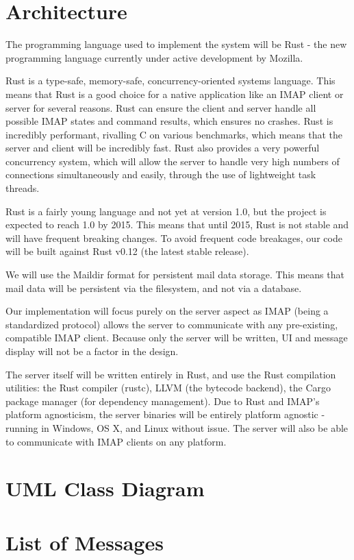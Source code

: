 \documentclass[a4paper,12pt]{article}
\begin{document}
\section*{Architecture}

The programming language used to implement the system will be Rust - the new programming language currently under active development by Mozilla.

Rust is a type-safe, memory-safe, concurrency-oriented systems language.
This means that Rust is a good choice for a native application like an IMAP client or server for several reasons.
Rust can ensure the client and server handle all possible IMAP states and command results, which ensures no crashes.
Rust is incredibly performant, rivalling C on various benchmarks, which means that the server and client will be incredibly fast.
Rust also provides a very powerful concurrency system, which will allow the server to handle very high numbers of connections simultaneously and easily, through the use of lightweight task threads.

Rust is a fairly young language and not yet at version 1.0, but the project is expected to reach 1.0 by 2015.
This means that until 2015, Rust is not stable and will have frequent breaking changes.
To avoid frequent code breakages, our code will be built against Rust v0.12 (the latest stable release).

We will use the Maildir format for persistent mail data storage.
This means that mail data will be persistent via the filesystem, and not via a database.

Our implementation will focus purely on the server aspect as IMAP (being a standardized protocol) allows the server to communicate with any pre-existing, compatible IMAP client.
Because only the server will be written, UI and message display will not be a factor in the design.

The server itself will be written entirely in Rust, and use the Rust compilation utilities: the Rust compiler (rustc), LLVM (the bytecode backend), the Cargo package manager (for dependency management).
Due to Rust and IMAP's platform agnosticism, the server binaries will be entirely platform agnostic - running in Windows, OS X, and Linux without issue.
The server will also be able to communicate with IMAP clients on any platform.

\section*{UML Class Diagram}

\section*{List of Messages}
\end{document}
